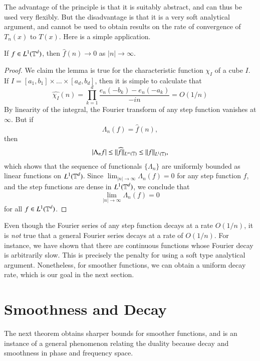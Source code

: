 The advantage of the principle is that it is suitably abstract, and can thus be used very flexibly. But the disadvantage is that it is a very soft analytical argument, and cannot be used to obtain results on the rate of convergence of $T_n(x)$ to $T(x)$. Here is a simple application.

\begin{lemma}
    If $f \in L^1(\operatorname{\mathbb{T}}^d)$, then $\widehat{f}(n) \to 0$ as $|n| \to \infty$.
\end{lemma}
\begin{proof}
    We claim the lemma is true for the characteristic function $\chi_I$ of a cube $I$. If $I = [a_1,b_1] \times \dots \times [a_d,b_d]$, then it is simple to calculate that
    \[ \widehat{\chi_I}(n) = \prod_{k = 1}^d \frac{e_n(-b_k) - e_n(-a_k)}{-in} = O(1/n) \]
    By linearity of the integral, the Fourier transform of any step function vanishes at $\infty$. But if
    \[ \Lambda_n(f) = \widehat{f}(n), \]
    then
    \[ |\Lambda_n f| \leq \| \widehat{f} \|_{L^\infty(\operatorname{\mathbb{T}})} \leq \| f \|_{L^1(\operatorname{\mathbb{T}})}, \]
    which shows that the sequence of functionals $\{ \Lambda_n \}$ are uniformly bounded as linear functions on $L^1(\operatorname{\mathbb{T}}^d)$. Since $\lim_{|n| \to \infty} \Lambda_n(f) = 0$ for any step function $f$, and the step functions are dense in $L^1(\operatorname{\mathbb{T}}^d)$, we conclude that
    \[ \lim_{|n| \to \infty} \Lambda_n(f) = 0 \]
    for all $f \in L^1(\operatorname{\mathbb{T}}^d)$.
\end{proof}

Even though the Fourier series of any step function decays at a rate $O(1/n)$, it is {\it not} true that a general Fourier series decays at a rate of $O(1/n)$. For instance, we have shown that there are continuous functions whose Fourier decay is arbitrarily slow. This is precisely the penalty for using a soft type analytical argument. Nonetheless, for smoother functions, we can obtain a uniform decay rate, which is our goal in the next section.

\section{Smoothness and Decay}

The next theorem obtains sharper bounds for smoother functions, and is an instance of a general phenomenon relating the duality because decay and smoothness in phase and frequency space.

